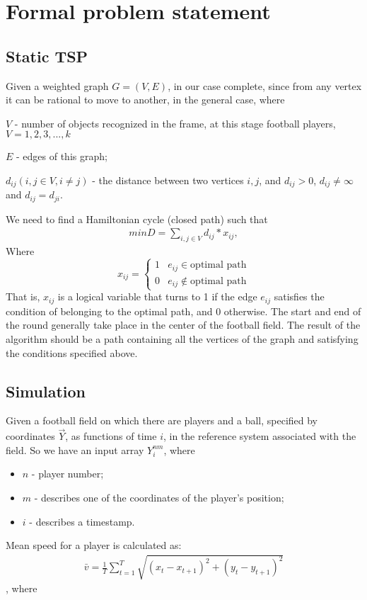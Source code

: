 \chapter{Formal problem statement}
\section{Static TSP}

Given a weighted graph $G = (V, E)$, in our case complete, since from any vertex it can be rational to move to another, in the general case, where

$V$ - number of objects recognized in the frame, at this stage football players, $V = {1, 2, 3, ..., k}$

$E$ - edges of this graph;

$d_{ij}(i, j \in V, i \neq j)$ - the distance between two vertices $i, j$, and $d_{ij} > 0$, $d_{ij} \neq \infty$ and $d_{ij} = d_{ji}$.

We need to find a Hamiltonian cycle (closed path) such that
\begin{align}
     minD = \sum_{i,j \in V} d_{ij} * x_{ij},
\end{align}
Where
\begin{equation}
     x_{ij} =
     \begin{cases}
         1 & e_{ij} \in \text{optimal path}\\
         0 & e_{ij} \notin \text{optimal path}
     \end{cases}
\end{equation}
That is, $x_{ij}$ is a logical variable that turns to 1 if the edge $e_{ij}$ satisfies the condition of belonging to the optimal path, and 0 otherwise. The start and end of the round generally take place in the center of the football field. The result of the algorithm should be a path containing all the vertices of the graph and satisfying the conditions specified above.

\section{Simulation}
Given a football field on which there are players and a ball, specified by coordinates $\vec Y$, as functions of time $i$, in the reference system associated with the field. So we have an input array $Y^{nm}_i$, where
\begin{itemize}
    \item $n$ - player number;
    \item $m$ - describes one of the coordinates of the player’s position;
    \item $i$ - describes a timestamp.
\end{itemize}
Mean speed for a player is calculated as: 
\begin{align}
    \bar v = \frac{1}{T}\sum_{t = 1}^{T}\sqrt{(x_t - x_{t+1})^2 + (y_t - y_{t+1})^2}
\end{align}, where 


